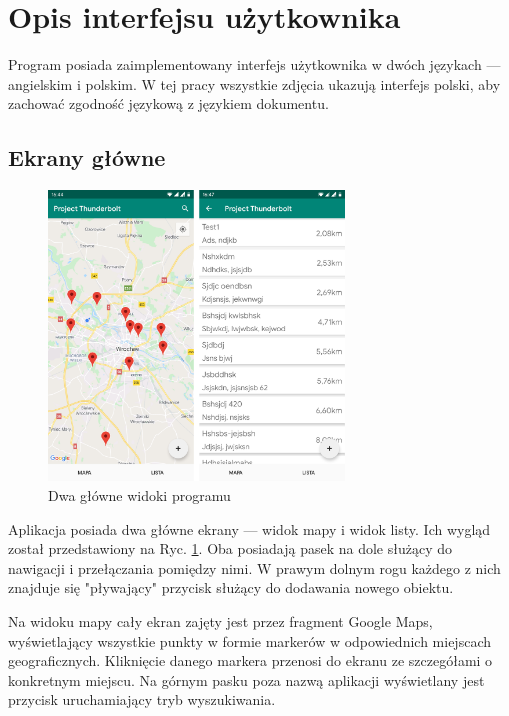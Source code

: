 \documentclass[polish,polish,a4paper,12pt]{article}
\let\sectioncmd\section
\renewcommand{\section}{\clearpage\sectioncmd}
\begin{document}
\section{Opis interfejsu użytkownika}\label{ui}

Program posiada zaimplementowany interfejs użytkownika w dwóch językach — angielskim i polskim. W tej pracy wszystkie zdjęcia ukazują interfejs polski, aby zachować zgodność językową z językiem dokumentu.

	\subsection{Ekrany główne}

	\begin{figure}[H]
		\centering
		\includegraphics[width = 0.7\textwidth]{screenshot-main}
		\caption{Dwa główne widoki programu}
		\label{fig:screenshotmain}
	\end{figure}

	Aplikacja posiada dwa główne ekrany — widok mapy i widok listy. Ich wygląd został przedstawiony na Ryc. \ref{fig:screenshotmain}. Oba posiadają pasek na dole służący do nawigacji i przełączania pomiędzy nimi. W prawym dolnym rogu każdego z nich znajduje się "pływający" przycisk służący do dodawania nowego obiektu.

	Na widoku mapy cały ekran zajęty jest przez fragment Google Maps, wyświetlający wszystkie punkty w formie markerów w odpowiednich miejscach geograficznych. Kliknięcie danego markera przenosi do ekranu ze szczegółami o konkretnym miejscu. Na górnym pasku poza nazwą aplikacji wyświetlany jest przycisk uruchamiający tryb wyszukiwania.
\end{document}
